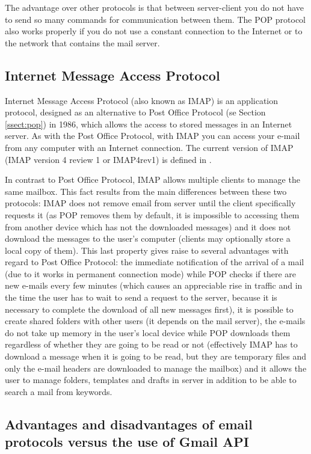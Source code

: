 The advantage over other protocols is that between server-client you do not have to send so many commands for communication between them. The POP protocol also works properly if you do not use a constant connection to the Internet or to the network that contains the mail server.

\subsection{Internet Message Access Protocol} \label{ssect:imap}

Internet Message Access Protocol (also known as IMAP) is an application protocol, designed as an alternative to Post Office Protocol (se Section \ref{ssect:pop}) in 1986, which allows the access to stored messages in an Internet server. As with the Post Office Protocol, with IMAP you can access your e-mail from any computer with an Internet connection. The current version of IMAP (IMAP version 4 review 1 or IMAP4rev1) is defined in \cite{rfc3501}.

In contrast to Post Office Protocol, IMAP allows multiple clients to manage the same mailbox. This fact results from the main differences between these two protocols: IMAP does not remove email from server until the client specifically requests it (as POP removes them by default, it is impossible to accessing them from another device which has not the downloaded messages) and it does not download the messages to the user's computer (clients may optionally store a local copy of them). This last property gives raise to several advantages with regard to Post Office Protocol: the immediate notification of the arrival of a mail (due to it works in permanent connection mode) while POP checks if there are new e-mails every few minutes (which causes an appreciable rise in traffic and in the time the user has to wait to send a request to the server, because it is necessary to complete the download of all new messages first), it is possible to create shared folders with other users (it depends on the mail server), the e-mails do not take up memory in the user's local device while POP downloads them regardless of whether they are going to be read or not (effectively IMAP has to download a message when it is going to be read, but they are temporary files and only the e-mail headers are downloaded to manage the mailbox) and it allows the user to manage folders, templates and drafts in server in addition to be able to search a mail from keywords.

\subsection{Advantages and disadvantages of email protocols versus the use of Gmail API} \label{ssect:protvsapi}

